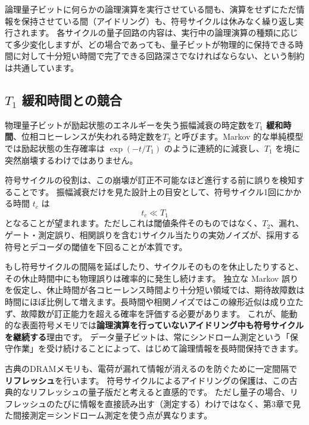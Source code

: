 論理量子ビットに何らかの論理演算を実行させている間も、演算をせずにただ情報を保持させている間（アイドリング）も、符号サイクルは休みなく繰り返し実行されます。
各サイクルの量子回路の内容は、実行中の論理演算の種類に応じて多少変化しますが、どの場合であっても、量子ビットが物理的に保持できる時間に対して十分短い時間で完了できる回路深さでなければならない、という制約は共通しています。

\subsection{$T_1$ 緩和時間との競合}

物理量子ビットが励起状態のエネルギーを失う振幅減衰の時定数を\textbf{$T_1$ 緩和時間}、位相コヒーレンスが失われる時定数を\textbf{$T_2$} と呼びます。Markov 的な単純模型では励起状態の生存確率は $\exp(-t/T_1)$ のように連続的に減衰し、$T_1$ を境に突然崩壊するわけではありません\cite{krantz2019guide}。

符号サイクルの役割は、この崩壊が訂正不可能なほど進行する前に誤りを検知することです。
振幅減衰だけを見た設計上の目安として、符号サイクル1回にかかる時間 $t_c$ は
\begin{equation}\label{eq:cycle_vs_t1}
  t_c \ll T_1
\end{equation}
となることが望まれます。ただしこれは閾値条件そのものではなく、$T_2$、漏れ、ゲート・測定誤り、相関誤りを含む1サイクル当たりの実効ノイズが、採用する符号とデコーダの閾値を下回ることが本質です\cite{krantz2019guide,dennis2002topological}。

もし符号サイクルの間隔を延ばしたり、サイクルそのものを休止したりすると、その休止時間中にも物理誤りは確率的に発生し続けます。
独立な Markov 誤りを仮定し、休止時間が各コヒーレンス時間より十分短い領域では、期待故障数は時間にほぼ比例して増えます。長時間や相関ノイズではこの線形近似は成り立たず、故障数が訂正能力を超える確率を評価する必要があります。
これが、能動的な表面符号メモリでは\textbf{論理演算を行っていないアイドリング中も符号サイクルを継続する}理由です。
データ量子ビットは、常にシンドローム測定という「保守作業」を受け続けることによって、はじめて論理情報を長時間保持できます。

\begin{notebox}
  古典のDRAMメモリも、電荷が漏れて情報が消えるのを防ぐために一定間隔で\textbf{リフレッシュ}を行います。
  符号サイクルによるアイドリングの保護は、この古典的なリフレッシュの量子版だと考えると直感的です。
  ただし量子の場合、リフレッシュのたびに情報を直接読み出す（測定する）わけではなく、第3章で見た間接測定＝シンドローム測定を使う点が異なります。
\end{notebox}

